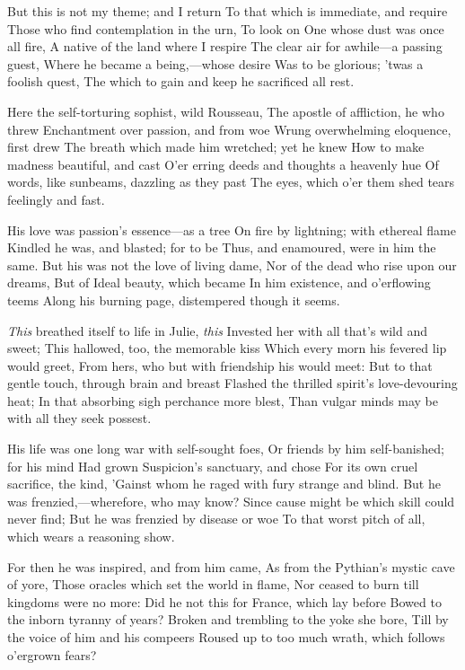 \documentclass[10pt,twocolumn]{book}
\begin{document}
   But this is not my theme; and I return
   To that which is immediate, and require
   Those who find contemplation in the urn,
   To look on One whose dust was once all fire,
   A native of the land where I respire
   The clear air for awhile---a passing guest,
   Where he became a being,---whose desire
   Was to be glorious; 'twas a foolish quest,
The which to gain and keep he sacrificed all rest.


   Here the self-torturing sophist, wild Rousseau,
   The apostle of affliction, he who threw
   Enchantment over passion, and from woe
   Wrung overwhelming eloquence, first drew
   The breath which made him wretched; yet he knew
   How to make madness beautiful, and cast
   O'er erring deeds and thoughts a heavenly hue
   Of words, like sunbeams, dazzling as they past
The eyes, which o'er them shed tears feelingly and fast.


   His love was passion's essence---as a tree
   On fire by lightning; with ethereal flame
   Kindled he was, and blasted; for to be
   Thus, and enamoured, were in him the same.
   But his was not the love of living dame,
   Nor of the dead who rise upon our dreams,
   But of Ideal beauty, which became
   In him existence, and o'erflowing teems
Along his burning page, distempered though it seems.


   \textit{This} breathed itself to life in Julie, \textit{this}
   Invested her with all that's wild and sweet;
   This hallowed, too, the memorable kiss
   Which every morn his fevered lip would greet,
   From hers, who but with friendship his would meet:
   But to that gentle touch, through brain and breast
   Flashed the thrilled spirit's love-devouring heat;
   In that absorbing sigh perchance more blest,
Than vulgar minds may be with all they seek possest.


   His life was one long war with self-sought foes,
   Or friends by him self-banished; for his mind
   Had grown Suspicion's sanctuary, and chose
   For its own cruel sacrifice, the kind,
   'Gainst whom he raged with fury strange and blind.
   But he was frenzied,---wherefore, who may know?
   Since cause might be which skill could never find;
   But he was frenzied by disease or woe
To that worst pitch of all, which wears a reasoning show.


   For then he was inspired, and from him came,
   As from the Pythian's mystic cave of yore,
   Those oracles which set the world in flame,
   Nor ceased to burn till kingdoms were no more:
   Did he not this for France, which lay before
   Bowed to the inborn tyranny of years?
   Broken and trembling to the yoke she bore,
   Till by the voice of him and his compeers
Roused up to too much wrath, which follows o'ergrown fears?
\end{document}
